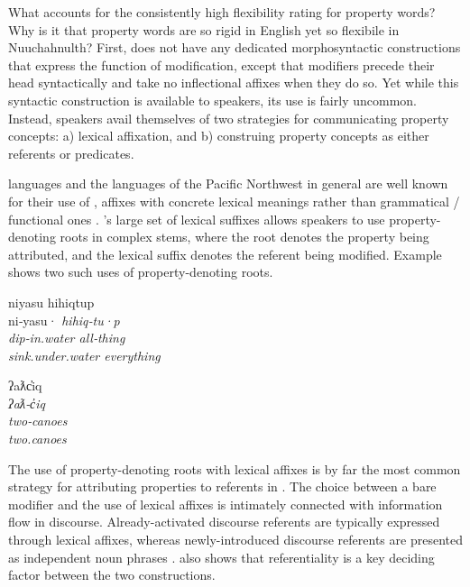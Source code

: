What accounts for the consistently high flexibility rating for property words? Why is it that property words are so rigid in English yet so flexibile in Nuuchahnulth? First,  does not have any dedicated morphosyntactic constructions that express the function of modification, except that modifiers precede their head syntactically and take no inflectional affixes when they do so. Yet while this syntactic construction is available to speakers, its use is fairly uncommon. Instead, speakers avail themselves of two strategies for communicating property concepts: a) lexical affixation, and b) construing property concepts as either referents or predicates.

 languages and the languages of the Pacific Northwest in general are well known for their use of , affixes with concrete lexical meanings rather than grammatical / functional ones \parencite{Mithun1997}. 's large set of lexical suffixes allows speakers to use property-denoting roots in complex stems, where the root denotes the property being attributed, and the lexical suffix denotes the referent being modified. Example  shows two such uses of property-denoting roots.

\begin{exe}
  \ex\label{ex:4.1}
  \begin{xlist}

    \ex\label{ex:4.1a}
    \gllll niyasu           hihiqtup\\
           ni‑yasu·         \em{hihiq}‑tu·p\\
           dip‑in.water     \em{all}‑thing\\
           sink.under.water everything\\

    \ex\label{ex:4.1b}
    \gllll ʔaƛc̓iq\\
           \em{ʔaƛ}‑c̓iq\\
           \em{two}‑canoes\\
           two.canoes\\

  \end{xlist}
\end{exe}

\noindent The use of property-denoting roots with lexical affixes is by far the most common strategy for attributing properties to referents in . The choice between a bare modifier and the use of lexical affixes is intimately connected with information flow in discourse. Already-activated discourse referents are typically expressed through lexical affixes, whereas newly-introduced discourse referents are presented as independent noun phrases \parencite[887--889]{Mithun1984}. \textcite[144]{Nakayama2001} also shows that referentiality is a key deciding factor between the two constructions.

